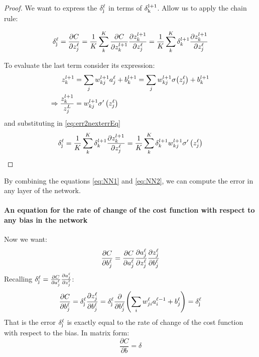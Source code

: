 \begin{proof}
We want to express the $\mathrm{\delta^\ell_j}$ in terms of $\mathrm{\delta_k^{l+1}}$. Allow us to apply the chain rule:

\begin{equation}
\mathrm{\delta^\ell_j} = \frac{\partial C}{\partial z_j^\ell} = \frac{1}{K}\sum_k^K \frac{\partial C}{\partial z_k^{l+1}} \frac{\partial z_k^{l+1}}{\partial z_j^\ell}  = \frac{1}{K}\sum_k^K \delta_k^{l+1} \frac{\partial z_k^{l+1}}{\partial z_j^\ell} 
\label{eq:err2nexterrEq}
\end{equation}

To evaluate the last term consider its expression:
\begin{equation}
\begin{aligned}
z_k^{l+1} &= \sum_j w_{kj}^{l+1}a_j^\ell + b_k^{l+1} = \sum_j w_{kj}^{l+1}\sigma\br{z_j^\ell} + b_k^{l+1}\\
\Rightarrow \frac{z_k^{l+1}}{z_j^{L}} &= w_{kj}^{l+1} \sigma'\left( z_j^\ell\right)
\end{aligned}
\end{equation}
and substituting in \autoref{eq:err2nexterrEq}
\begin{equation}
\mathrm{\delta^\ell_j} = \frac{1}{K}\sum_k^K \delta_k^{l+1} \frac{\partial z_k^{l+1}}{\partial z_j^\ell}  = \frac{1}{K}\sum_k^K \delta_k^{l+1} w_{kj}^{l+1} \sigma'\left( z_j^\ell\right)
\label{eq:NN2}
\end{equation}
\end{proof}

By combining the equations \autoref{eq:NN1} and \autoref{eq:NN2}, we can compute the error in any layer of the network.

\paragraph{An equation for the rate of change of the cost function with respect to any bias in the network}
Now we want:
\begin{equation}
\frac{\mathrm{\partial} C}{\mathrm{\partial} b_j^\ell} = \frac{\mathrm{\partial} C}{\mathrm{\partial} a_j^\ell} \frac{\mathrm{\partial} a_j^\ell}{\mathrm{\partial} z_j^\ell} \frac{\mathrm{\partial} z_j^\ell}{\mathrm{\partial} b_j^\ell} 
\end{equation}
Recalling $\mathrm{\delta^\ell_j}= \frac{\mathrm{\partial} C}{\mathrm{\partial} a_j^\ell} \frac{\mathrm{\partial} a_j^\ell}{\mathrm{\partial} z_j^\ell}$:
\begin{equation}
\frac{\pr C}{\pr b_j^\ell} = \derlj \frac{\pr z_j^\ell}{\pr b_j^\ell} =  \derlj \frac{\pr }{\pr b_j^\ell} \br{\sum_i w_{ji}^\ell a_i^{\ell-1}+b_j^\ell} =  \derlj 
\end{equation}
That is the error $\mathrm{\delta^\ell_j}$ is exactly equal to the rate of change of the cost function with respect to the bias. In matrix form:
\begin{equation}
\frac{\partial C}{\partial b} = \delta
\end{equation}

